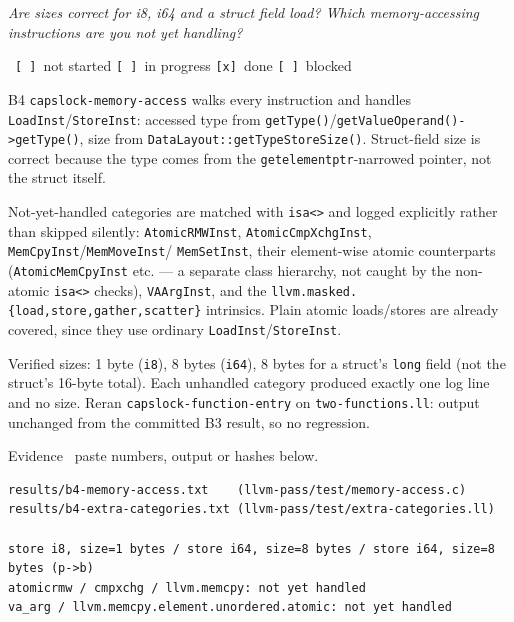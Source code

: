 \documentclass[11pt,a4paper]{article}
\newcommand{\lbl}[1]{\vspace{5pt}\noindent{\scriptsize\bfseries\color{mute}\MakeUppercase{#1}}\par\vspace{1pt}}
\begin{document}
\lbl{You will be asked}
\begin{askbox}
\emph{Are sizes correct for i8, i64 and a struct field load? Which memory-accessing instructions are you not yet handling?}
\end{askbox}
\ \texttt{[\ ]}~not started \quad
  \texttt{[\ ]}~in progress \quad \texttt{[x]}~done \quad
  \texttt{[\ ]}~blocked\par\vspace{3pt}
\begin{answerbox}{B4}
\texttt{capslock-memory-access} walks every instruction and handles
\texttt{LoadInst}/\texttt{StoreInst}: accessed type from
\texttt{getType()}/\texttt{getValueOperand()->getType()}, size from
\texttt{DataLayout::getTypeStoreSize()}. Struct-field size is correct
because the type comes from the \texttt{getelementptr}-narrowed pointer, not
the struct itself.

Not-yet-handled categories are matched with \texttt{isa<>} and logged
explicitly rather than skipped silently: \texttt{AtomicRMWInst},
\texttt{AtomicCmpXchgInst}, \texttt{MemCpyInst}/\texttt{MemMoveInst}/
\texttt{MemSetInst}, their element-wise atomic counterparts
(\texttt{AtomicMemCpyInst} etc. --- a separate class hierarchy, not caught by
the non-atomic \texttt{isa<>} checks), \texttt{VAArgInst}, and the
\texttt{llvm.masked.\{load,store,gather,scatter\}} intrinsics. Plain atomic
loads/stores are already covered, since they use ordinary
\texttt{LoadInst}/\texttt{StoreInst}.

Verified sizes: 1 byte (\texttt{i8}), 8 bytes (\texttt{i64}), 8 bytes for a
struct's \texttt{long} field (not the struct's 16-byte total). Each
unhandled category produced exactly one log line and no size. Reran
\texttt{capslock-function-entry} on \texttt{two-functions.ll}: output
unchanged from the committed B3 result, so no regression.

{\scriptsize\color{mute}Evidence \textemdash\ paste numbers, output or hashes below.}
\begin{verbatim}
results/b4-memory-access.txt    (llvm-pass/test/memory-access.c)
results/b4-extra-categories.txt (llvm-pass/test/extra-categories.ll)

store i8, size=1 bytes / store i64, size=8 bytes / store i64, size=8 bytes (p->b)
atomicrmw / cmpxchg / llvm.memcpy: not yet handled
va_arg / llvm.memcpy.element.unordered.atomic: not yet handled
\end{verbatim}
\end{answerbox}
\end{document}
